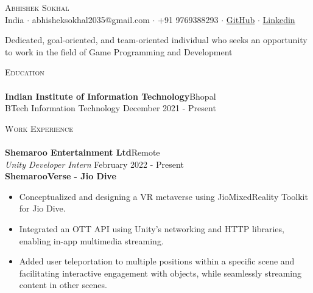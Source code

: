 \documentclass[a4paper]{article}
\newcommand{\lineunder} {
    \vspace*{-8pt} \\
    \hspace*{-18pt} \hrulefill \\
}
\newcommand{\header} [1] {
    {\hspace*{-18pt}\vspace*{6pt} \textsc{#1}}
    \vspace*{-6pt} \lineunder
}
\begin{document}
\vspace*{-40pt}

    

\vspace*{-9pt}
\begin{center}
	{\Huge \scshape {Abhishek Sokhal}}\\
	\vspace{2mm}
	India $\cdot$ abhisheksokhal2035@gmail.com $\cdot$ +91 9769388293 $\cdot$ \href{https://github.com/Distroto}{GitHub} $\cdot$ \href{https://www.linkedin.com/in/abhishek-sokhal-630a951ba/}{Linkedin} \\
\end{center}
\vspace{-5mm}
\begin{center}
Dedicated, goal-oriented, and team-oriented individual who seeks an opportunity to work in the field of Game Programming and Development\\
\end{center}
\vspace{-1mm}
\header{Education}
\vspace{0mm}
\textbf{Indian Institute of Information Technology}\hfill Bhopal\\
BTech Information Technology \hfill December 2021 - Present\\
\vspace{-1mm}

\header{Work Experience}
\vspace{0mm}
\textbf{Shemaroo Entertainment Ltd}\hfill Remote\\
{\textit {Unity Developer Intern}} \hfill February 2022 - Present\\


\hspace{1.5em}\textbf{ShemarooVerse - Jio Dive} 
\begin{itemize} 
\vspace{-2.5mm}
        \item Conceptualized and designing a VR metaverse using JioMixedReality Toolkit for Jio Dive. 
 \vspace{-2.5mm}
        \item Integrated an OTT API using Unity's networking and HTTP libraries, enabling in-app multimedia streaming.
 \vspace{-2.5mm} 
        \item Added user teleportation to multiple positions within a specific scene and facilitating interactive engagement with objects, while seamlessly streaming content in other scenes.
 \vspace{-2.5mm} 
\end{itemize}
\end{document}
